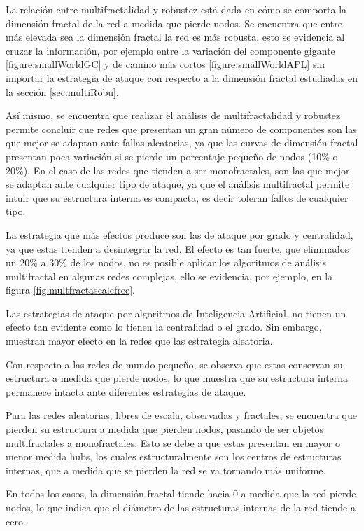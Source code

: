 La relación entre multifractalidad y robustez está dada en cómo se comporta la dimensión fractal de la red a medida que pierde nodos. Se encuentra que entre más elevada sea la dimensión fractal la red es más robusta, esto se evidencia al cruzar la información, por ejemplo entre la variación del componente gigante \ref{figure:smallWorldGC} y de camino más cortos \ref{figure:smallWorldAPL} sin importar la estrategia de ataque con respecto a la dimensión fractal estudiadas en la sección \ref{sec:multiRobu}.

Así mismo, se encuentra que realizar el análisis de multifractalidad y robustez permite concluir que redes que presentan un gran número de componentes son las que mejor se adaptan ante fallas aleatorias, ya que las curvas de dimensión fractal presentan poca variación si se pierde un porcentaje pequeño de nodos (10\% o 20\%). En el caso de las redes que tienden a ser monofractales, son las que mejor se adaptan ante cualquier tipo de ataque, ya que el análisis multifractal permite intuir que su estructura interna es compacta, es decir toleran fallos de cualquier tipo.

La estrategia que más efectos produce son las de ataque por grado y centralidad, ya que estas tienden a desintegrar la red. El efecto es tan fuerte, que eliminados un 20\% a 30\% de los nodos, no es posible aplicar los algoritmos de análisis multifractal en algunas redes complejas, ello se evidencia, por ejemplo, en la figura \ref{fig:multfractascalefree}.

Las estrategias de ataque por algoritmos de Inteligencia Artificial, no tienen un efecto tan evidente como lo tienen la centralidad o el grado. Sin embargo, muestran mayor efecto en la redes que las estrategia aleatoria.

Con respecto a las redes de mundo pequeño, se observa que estas conservan su estructura a medida que pierde nodos, lo que muestra que su estructura interna permanece intacta ante diferentes estrategias de ataque.

Para las redes aleatorias, libres de escala, observadas y fractales, se encuentra que pierden su estructura a medida que pierden nodos, pasando de ser objetos multifractales a monofractales. Esto se debe a que estas presentan en mayor o menor medida hubs, los cuales estructuralmente son los centros de estructuras internas, que a medida que se pierden la red se va tornando más uniforme.

En todos los casos, la dimensión fractal tiende hacia 0 a medida que la red pierde nodos, lo que indica que el diámetro de las estructuras internas de la red tiende a cero.